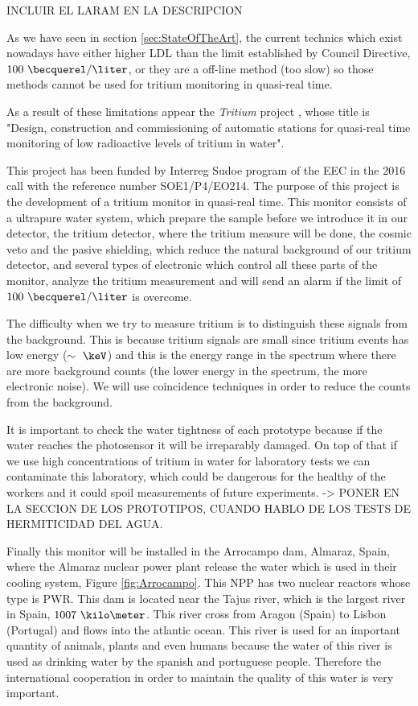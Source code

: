 INCLUIR EL LARAM EN LA DESCRIPCION

As we have seen in section \ref{sec:StateOfTheArt}, the current technics which exist nowadays have either higher LDL than the limit established by Council Directive, $100~\becquerel/\liter$, or they are a off-line method (too slow) so those methods cannot be used for tritium monitoring in quasi-real time. 

As a result of these limitations appear the \textit{Tritium} project \cite{TRITIUM}, whose title is "Design, construction and commissioning of automatic stations for quasi-real time monitoring of low radioactive levels of tritium in water".

This project has been funded by Interreg Sudoe program of the EEC in the 2016 call with the reference number SOE1/P4/EO214. The purpose of this project is the development of a tritium monitor in quasi-real time. This monitor consists of a ultrapure water system, which prepare the sample before we introduce it in our detector, the tritium detector, where the tritium measure will be done, the cosmic veto and the pasive shielding, which reduce the natural background of our tritium detector, and several types of electronic which control all these parts of the monitor, analyze the tritium measurement and will send an alarm if the limit of $100~\becquerel/\liter$ is overcome.

The difficulty when we try to measure tritium is to distinguish these signals from the background. This is because tritium signals are small since tritium events has low energy ($\sim~\keV$) and this is the energy range in the spectrum where there are more background counts (the lower energy in the spectrum, the more electronic noise). We will use coincidence techniques in order to reduce the counts from the background.

It is important to check the water tightness of each prototype because if the water reaches the photosensor it will be irreparably damaged. On top of that if we use high concentrations of tritium in water for laboratory tests we can contaminate this laboratory, which could be dangerous for the healthy of the workers and it could spoil measurements of future experiments. -> PONER EN LA SECCION DE LOS PROTOTIPOS, CUANDO HABLO DE LOS TESTS DE HERMITICIDAD DEL AGUA.

Finally this monitor will be installed in the Arrocampo dam, Almaraz, Spain, where the Almaraz nuclear power plant release the water which is used in their cooling system, Figure \ref{fig:Arrocampo}. This NPP has two nuclear reactors whose type is PWR. This dam is located near the Tajus river, which is the largest river in Spain, $1007~\kilo\meter$. This river cross from Aragon (Spain) to Lisbon (Portugal) and flows into the atlantic ocean. This river is used for an important quantity of animals, plants and even humans because the water of this river is used as drinking water by the spanish and portuguese people. Therefore the international cooperation in order to maintain the quality of this water is very important.

